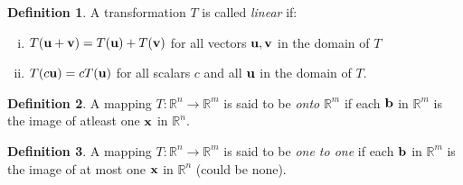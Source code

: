 \documentclass[12pt,letterpaper]{article}
\newcommand{\rr}{\mathbb R}     %
\renewcommand{\v}{{\bf v}}
\newcommand{\x}{{\bf x}}
\renewcommand{\b}{{\bf b}}
\renewcommand{\u}{{\bf u}}
\newcommand{\0}{{\bf 0}}
\theoremstyle{plain}
\theoremstyle{definition}
\newtheorem{definition}{Definition}
\begin{document}
\begin{definition} A transformation $T$ is called \emph{linear} if:
\begin{enumerate}[(i)]
\item $T(\u+\v)=T(\u)+T(\v)$ for all vectors $\u,\v$ in the domain of $T$
\item $T(c\u)=cT(\u)$ for all scalars $c$ and all $\u$ in the domain of $T$.
\end{enumerate}

\end{definition}
\begin{definition}A mapping $T:\mathbb{R}^n\rightarrow \rr^m$ is said to be \emph{onto} $\rr^m$ if each $\b$ in $\rr^m$ is the image of atleast one $\x$ in $\rr^n$.
\end{definition}
\begin{definition}A mapping $T:\mathbb{R}^n\rightarrow \rr^m$ is said to be \emph{one to one} if each $\b$ in $\rr^m$ is the image of at most one $\x$ in $\rr^n$ (could be none).
\end{definition}
\end{document}

